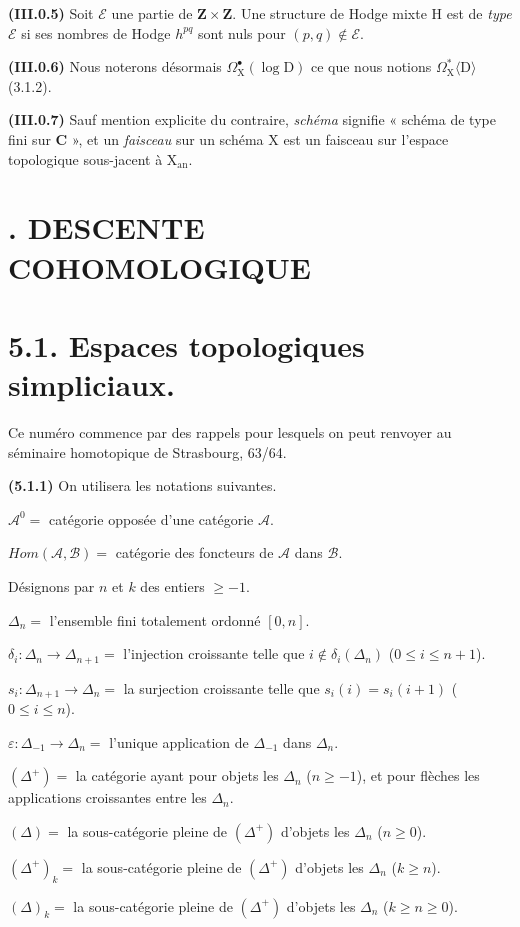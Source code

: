 \documentclass[11pt,leqno]{article}
\begin{document}
\textbf{(III.0.5)} Soit \(\mathscr{E}\) une partie de \(\mathbf{Z}\times\mathbf{Z}\). Une structure de Hodge mixte \(\mathrm{H}\) est de \textit{type} \(\mathscr{E}\) si ses nombres de Hodge \(h^{pq}\) sont nuls pour \((p,q)\notin\mathscr{E}\).

\textbf{(III.0.6)} Nous noterons désormais \(\Omega_{\mathrm{X}}^{\bullet}(\log\mathrm{D})\) ce que nous notions \(\Omega_{\mathrm{X}}^*\langle\mathrm{D}\rangle\) (3.1.2).

\textbf{(III.0.7)} Sauf mention explicite du contraire, \textit{schéma} signifie « schéma de type fini sur \(\mathbf{C}\) », et un \textit{faisceau} sur un schéma \(\mathrm{X}\) est un faisceau sur l’espace topologique sous-jacent à \(\mathrm{X}_{\mathrm{an}}\).

\section*{. DESCENTE COHOMOLOGIQUE}

\section*{5.1. Espaces topologiques simpliciaux.}

Ce numéro commence par des rappels pour lesquels on peut renvoyer au séminaire homotopique de Strasbourg, 63/64.

\textbf{(5.1.1)} On utilisera les notations suivantes.

\noindent \(\mathscr{A}^{0}=\) catégorie opposée d’une catégorie \(\mathscr{A}\).\par
\noindent \(\mathit{Hom}(\mathscr{A},\mathscr{B})=\) catégorie des foncteurs de \(\mathscr{A}\) dans \(\mathscr{B}\).\par

Désignons par \(n\) et \(k\) des entiers \(\geq-1\).

\noindent \(\Delta_n=\) l’ensemble fini totalement ordonné \([0,n]\).\par
\noindent \(\delta_i:\Delta_n\to\Delta_{n+1}=\) l’injection croissante telle que \(i\notin\delta_i(\Delta_n)\) (\(0\leq i\leq n+1\)).\par
\noindent \(s_i:\Delta_{n+1}\to\Delta_n=\) la surjection croissante telle que \(s_i(i)=s_i(i+1)\) (\(0\leq i\leq n\)).\par
\noindent \(\varepsilon:\Delta_{-1}\to\Delta_n=\) l’unique application de \(\Delta_{-1}\) dans \(\Delta_n\).\par
\noindent \((\Delta^+)=\) la catégorie ayant pour objets les \(\Delta_n\) (\(n\geq-1\)), et pour flèches les applications croissantes entre les \(\Delta_n\).\par
\noindent \((\Delta)=\) la sous-catégorie pleine de \((\Delta^+)\) d’objets les \(\Delta_n\) (\(n\geq0\)).\par
\noindent \((\Delta^+)_k=\) la sous-catégorie pleine de \((\Delta^+)\) d’objets les \(\Delta_n\) (\(k\geq n\)).\par
\noindent \((\Delta)_k=\) la sous-catégorie pleine de \((\Delta^+)\) d’objets les \(\Delta_n\) (\(k\geq n\geq0\)).\par
\end{document}
